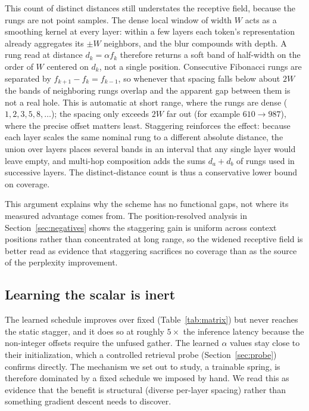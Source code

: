 \documentclass[11pt]{article}
\begin{document}
This count of distinct distances still understates the receptive field, because
the rungs are not point samples. The dense local window of width $W$ acts as a
smoothing kernel at every layer: within a few layers each token's representation
already aggregates its $\pm W$ neighbors, and the blur compounds with depth. A
rung read at distance $d_k=\alpha f_k$ therefore returns a soft band of half-width
on the order of $W$ centered on $d_k$, not a single position. Consecutive
Fibonacci rungs are separated by $f_{k+1}-f_k=f_{k-1}$, so whenever that spacing
falls below about $2W$ the bands of neighboring rungs overlap and the apparent gap
between them is not a real hole. This is automatic at short range, where the rungs
are dense ($1,2,3,5,8,\dots$); the spacing only exceeds $2W$ far out (for example
$610\to987$), where the precise offset matters least. Staggering reinforces the
effect: because each layer scales the same nominal rung to a different absolute
distance, the union over layers places several bands in an interval that any
single layer would leave empty, and multi-hop composition adds the sums
$d_a+d_b$ of rungs used in successive layers. The distinct-distance count is thus
a conservative lower bound on coverage.

This argument explains why the scheme has no functional gaps, not where its
measured advantage comes from. The position-resolved analysis in
Section~\ref{sec:negatives} shows the staggering gain is uniform across context
positions rather than concentrated at long range, so the widened receptive field
is better read as evidence that staggering sacrifices no coverage than as the
source of the perplexity improvement.

\subsection{Learning the scalar is inert}
\label{sec:inert}

The learned schedule improves over fixed (Table~\ref{tab:matrix}) but never
reaches the static stagger, and it does so at roughly $5\times$ the inference
latency because the non-integer offsets require the unfused gather. The learned
$\alpha$ values stay close to their initialization, which a controlled retrieval
probe (Section~\ref{sec:probe}) confirms directly. The mechanism we set out to
study, a trainable spring, is therefore dominated by a fixed schedule we
imposed by hand. We read this as evidence that the benefit is structural (diverse
per-layer spacing) rather than something gradient descent needs to discover.
\end{document}
